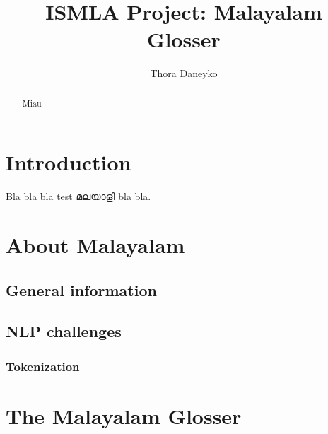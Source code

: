 \documentclass[a4paper]{article}
\author{Thora Daneyko}
\title{ISMLA Project: Malayalam Glosser}
\begin{document}
\maketitle

\begin{abstract}
Miau
\end{abstract}


\section{Introduction}

Bla bla bla test മലയാളി bla bla.

\section{About Malayalam}

\subsection{General information}

\subsection{NLP challenges}

\subsubsection{Tokenization}

\section{The Malayalam Glosser}
\end{document}
